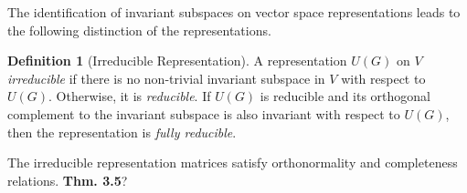 \documentclass[12pt]{report}
\theoremstyle{definition}
\newtheorem{definition}{Definition}[chapter]
\begin{document}
The identification of invariant subspaces on vector space representations leads to the following distinction of the representations.
\begin{definition}[Irreducible Representation]
    A representation $U(G)$ on $V$ \textit{irreducible} if there is no non-trivial invariant subspace in $V$ with respect to $U(G)$. Otherwise, it is \textit{reducible}. If $U(G)$ is reducible and its orthogonal complement to the invariant subspace is also invariant with respect to $U(G)$, then the representation is \textit{fully reducible}.
    
\end{definition}

The irreducible representation matrices satisfy orthonormality and completeness relations.\textbf{ Thm. 3.5}?

% 
% 
\end{document}
